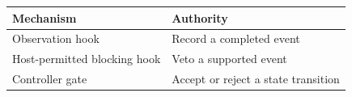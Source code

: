 \begin{tabular}{@{}P{4.0cm}P{8.5cm}@{}}
\toprule
\textbf{Mechanism} & \textbf{Authority} \\
\midrule
Observation hook & Record a completed event \\
Host-permitted blocking hook & Veto a supported event \\
Controller gate & Accept or reject a state transition \\
\bottomrule
\end{tabular}
